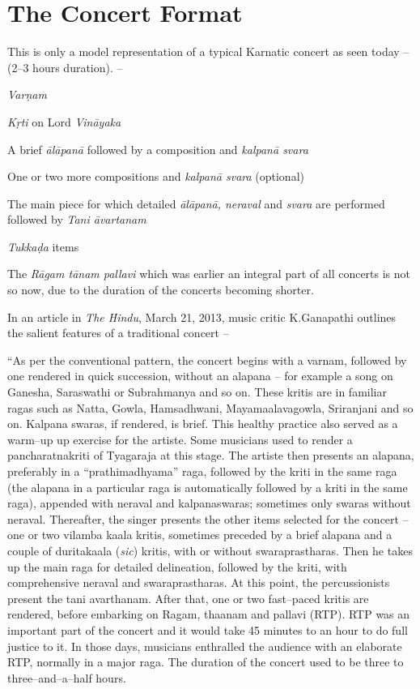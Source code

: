 \section*{The Concert Format}

This is only a model representation of a typical Karnatic concert as seen today – (2–3 hours duration). –

\textit{Varṇam}

\textit{Kṛti} on Lord \textit{Vināyaka}

A brief \textit{ālāpanā} followed by a composition and \textit{kalpanā svara}

One or two more compositions and \textit{kalpanā svara} (optional)

The main piece for which detailed \textit{ālāpanā, neraval} and \textit{svara} are performed followed by \textit{Tani āvartanam}

\textit{Tukkaḍa} items

The \textit{Rāgam tānam pallavi} which was earlier an integral part of all concerts is not so now, due to the duration of the concerts becoming shorter.

In an article in \textit{The Hindu}, March 21, 2013, music critic K.Ganapathi outlines the salient features of a traditional concert –

\begin{myquote}
“As per the conventional pattern, the concert begins with a varnam, followed by one rendered in quick succession, without an alapana – for example a song on Ganesha, Saraswathi or Subrahmanya and so on. These kritis are in familiar ragas such as Natta, Gowla, Hamsadhwani, Mayamaalavagowla, Sriranjani and so on. Kalpana swaras, if rendered, is brief. This healthy practice also served as a warm–up up exercise for the artiste. Some musicians used to render a pancharatnakriti of Tyagaraja at this stage. The artiste then presents an alapana, preferably in a “prathimadhyama” raga, followed by the kriti in the same raga (the alapana in a particular raga is automatically followed by a kriti in the same raga), appended with neraval and kalpanaswaras; sometimes only swaras without neraval. Thereafter, the singer presents the other items selected for the concert – one or two vilamba kaala kritis, sometimes preceded by a brief alapana and a couple of duritakaala (\textit{sic}) kritis, with or without swaraprastharas. Then he takes up the main raga for detailed delineation, followed by the kriti, with comprehensive neraval and swaraprastharas. At this point, the percussionists present the tani avarthanam. After that, one or two fast–paced kritis are rendered, before embarking on Ragam, thaanam and pallavi (RTP). RTP was an important part of the concert and it would take 45 minutes to an hour to do full justice to it. In those days, musicians enthralled the audience with an elaborate RTP, normally in a major raga. The duration of the concert used to be three to three–and–a–half hours.
\end{myquote}

